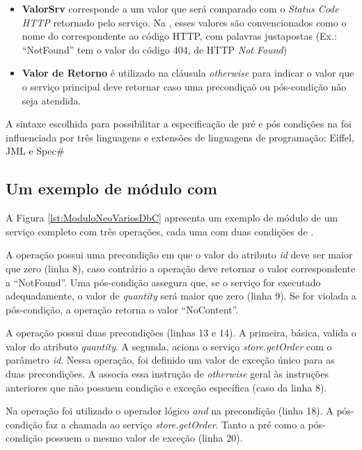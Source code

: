\begin{itemize}
 \item \textbf{ValorSrv} corresponde a um valor que será comparado com o
 \textit{Status Code HTTP} retornado pelo serviço. Na \neoidl{}, esses valores
 são convencionados como o nome do correspondente ao código HTTP, com palavras
 justapostas (Ex.: ``NotFound'' tem o valor do código 404, de HTTP \textit{Not
 Found})

\item \textbf{Valor de Retorno} é utilizado na cláusula \emph{otherwise} para
indicar o valor que o serviço principal deve retornar caso uma precondiçaõ ou pós-condição
não seja atendida.

\end{itemize}

A sintaxe escolhida para possibilitar a especificação de pré e pós condições
na \neoidl{} foi influenciada por três linguagens e extensões de linguagens de
programação: Eiffel, JML e Spec\# 


\subsection{Um exemplo de módulo com \designbycontract{}}

A Figura \ref{lst:ModuloNeoVariosDbC} apresenta um exemplo de módulo \neoidl{}
de um serviço completo com três operações, cada uma com duas
condições de \designbycontract{}.

A operação  possui uma precondição em que o valor do atributo \emph{id} 
deve ser maior que zero (linha 8), caso contrário a operação deve retornar o valor
correspondente a ``NotFound''. Uma pós-condição assegura que, se o serviço for
executado adequadamente, o valor de \emph{quantity} será maior que zero (linha
9). Se for violada a pós-condição, a operação  retorna o valor
``NoContent''.

A operação  possui duas precondições (linhas 13 e 14). A primeira,
básica, valida o valor do atributo \emph{quantity}. A segunda, aciona o serviço
\emph{store.getOrder} com o parâmetro \emph{id}. Nessa operação, foi
definido um valor de exceção único para as duas precondições. A \neoidl{}
associa essa instrução de \emph{otherwise} geral às instruções anteriores que
não possuem condição e exceção específica (caso da linha 8).

Na operação  foi utilizado o operador lógico \emph{and} na
precondição (linha 18). A pós-condição faz a chamada ao serviço
\emph{store.getOrder}. Tanto a pré como a pós-condição possuem o mesmo valor de
exceção (linha 20). 

